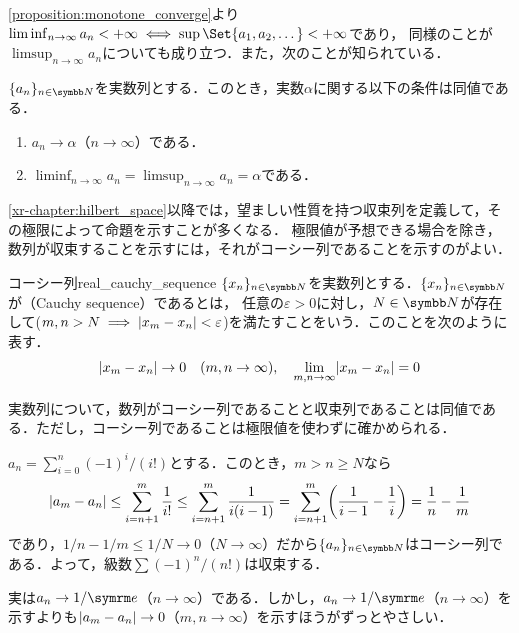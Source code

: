 \documentclass[../../main]{subfiles}
\begin{document}
\cref{proposition:monotone_converge}より\(\liminf_{n\to\infty}a_n<+\infty\iff\sup\Set{a_1,a_2,\dotsc}<+\infty\)であり，
同様のことが\(\limsup_{n\to\infty}a_n\)についても成り立つ．また，次のことが知られている．

\begin{proposition}{}{}
  \(\seq{a_n}_{n\in\numset{N}}\)を実数列とする．このとき，実数\(\alpha\)に関する以下の条件は同値である．
  \begin{enumerate}
    \item \(a_n\to\alpha\)（\(n\to\infty\)）である．
    \item \(\liminf_{n\to\infty}a_n=\limsup_{n\to\infty}a_n=\alpha\)である．
  \end{enumerate}
\end{proposition}

\cref{xr-chapter:hilbert_space}以降では，望ましい性質を持つ収束列を定義して，その極限によって命題を示すことが多くなる．
極限値が予想できる場合を除き，数列が収束することを示すには，それがコーシー列であることを示すのがよい．

\begin{definition}{コーシー列}{real_cauchy_sequence}
  \(\seq{x_n}_{n\in\numset{N}}\)を実数列とする．\(\seq{x_n}_{n\in\numset{N}}\)が（Cauchy sequence）であるとは，
  任意の\(\varepsilon>0\)に対し，\(N\in\numset{N}\)が存在して(\(m,n>N\implies\lvert x_m-x_n\rvert<\varepsilon\))を満たすことをいう．このことを次のように表す．
  \[
    \lvert x_m-x_n\rvert \to 0\quad(m,n\to\infty),
    \quad\lim_{m,n\to\infty}\lvert x_m-x_n\rvert = 0
  \]
\end{definition}

実数列について，数列がコーシー列であることと収束列であることは同値である．ただし，コーシー列であることは極限値を使わずに確かめられる．

\begin{example}
  \(a_n=\sum_{i=0}^n(-1)^i/(i!)\)とする．このとき，\(m>n\geq N\)なら
  \[
    \abs{a_m-a_n} \leq \sum_{i=n+1}^m\frac{1}{i!}
    \leq \sum_{i=n+1}^m\frac{1}{i(i-1)}
    = \sum_{i=n+1}^m\pqty*{\frac{1}{i-1}-\frac{1}{i}}
    = \frac{1}{n}-\frac{1}{m}
  \]
  であり，\(1/n-1/m\leq 1/N\to 0\)（\(N\to\infty\)）だから\(\seq{a_n}_{n\in\numset{N}}\)はコーシー列である．よって，級数\(\sum(-1)^n/(n!)\)は収束する．
\end{example}

\begin{note}
  実は\(a_n\to 1/\napr\)（\(n\to\infty\)）である．しかし，\(a_n\to 1/\napr\)（\(n\to\infty\)）を示すよりも\(\lvert a_m-a_n\rvert\to 0\)（\(m,n\to\infty\)）を示すほうがずっとやさしい．
\end{note}
\end{document}
